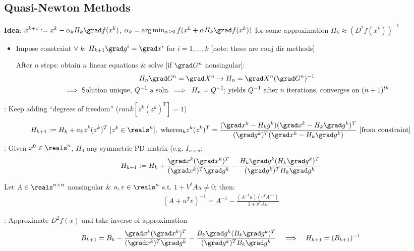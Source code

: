 \documentclass[12pt]{extarticle}
\begin{document}
\newp
\subsection{Quasi-Newton Methods}
\textbf{Idea}: $x^{k+1}:=x^k-\alpha_kH_k\grad f(x^k)$, $\alpha_k=\arg\min_{\alpha\geq0}f(x^k+\alpha H_k\grad f(x^k))$ for some approximation $H_k\approx(D^2f(x^k))^{-1}$ \begin{itemize}
    \item Impose constraint $\forall\;k$: $H_{k+1}\grad g^i=\grad x^i$ for $i=1,\hdots,k$ [note: these are conj dir methods]

    After $n$ steps: obtain $n$ linear equations \& solve [if $\grad G^n$ nonsingular]: \begin{gather*}
        H_n\grad G^n=\grad X^n\rightarrow H_n=\grad X^n(\grad G^n)^{-1} \\
        \implies\text{Solution unique, $Q^{-1}$ a soln.}\implies\text{ $H_n=Q^{-1}$; yields $Q^{-1}$ after $n$ iterations, converges on $(n+1)^{th}$}
    \end{gather*}
\end{itemize}
: Keep adding ``degrees of freedom'' ($rank[z^k(z^k)^T]=1$) \begin{align*}
    H_{k+1}:=H_k+a_kz^k(z^k)^T\;[z^k\in\reals^n],\text{ where} a_kz^k(z^k)^T=\frac{(\grad x^k-H_kg^k)(\grad x^k-H_k\grad g^k)^T}{(\grad g^k)^T(\grad x^k-H_k\grad g^k)}\text{ [from constraint]}
\end{align*}
: Given $x^0\in\reals^n$, $H_0$ any symmetric PD matrix (e.g. $I_{n\times n}$: \begin{align*}
    H_{k+1}:=H_k+\frac{\grad x^k(\grad x^k)^T}{(\grad x^k)^T\grad g^k}-\frac{H_k\grad g^k(H_k\grad g^k)^T}{(\grad g^k)^TH_k\grad g^k}
\end{align*}
\begin{lemma}
    Let $A\in\reals^{n\times n}$ nonsingular \& $u,v\in\reals^n$ s.t. $1+V^tAu\neq0$; then: \begin{align*}
        (A+u^Tv)^{-1}=A^{-1}-\frac{(A^{-1}u)(v^TA^{-1})}{1+v^TAu}
    \end{align*}
\end{lemma}
\pstart
{}: Approximate $D^2f(x)$ and take inverse of approximation \begin{align*}
    B_{k+1}=B_k-\frac{\grad x^k(\grad x^k)^T}{(\grad x^k)^T\grad g^k}-\frac{B_k\grad g^k(B_k\grad g^k)^T}{(\grad g^k)^TB_k\grad g^k}\quad\Longrightarrow\quad H_{k+1}=(B_{k+1})^{-1}
\end{align*}
\end{document}
